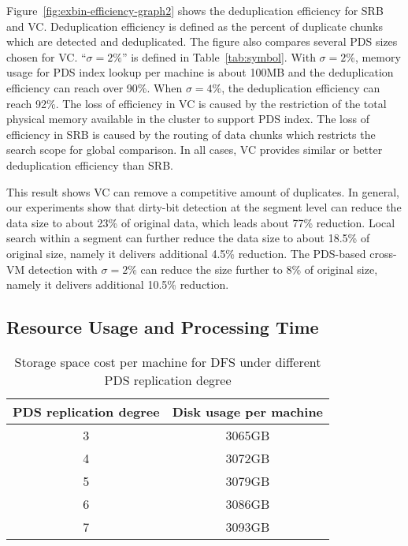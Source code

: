 Figure~\ref{fig:exbin-efficiency-graph2} shows the deduplication efficiency for SRB and VC.
Deduplication efficiency is defined as the percent of duplicate chunks
which are detected and deduplicated.
The figure also compares several PDS sizes chosen for VC. ``$\sigma=2\%$'' 
is defined in Table~\ref{tab:symbol}. 
With $\sigma=2\%$, memory usage for PDS index lookup per machine is about 100MB
and  the deduplication efficiency can reach over 90\%.
When $\sigma=4\%$, the deduplication efficiency can reach 92\%. 
The loss of efficiency in VC is caused by the restriction of the total physical memory available
in the cluster to support PDS index.  
The loss of efficiency in SRB is caused by the routing of data chunks which restricts the search scope
for global comparison.
In all cases, VC provides similar or better deduplication efficiency than SRB.

This result shows VC can remove  a competitive amount of duplicates.
In general, our experiments show that
dirty-bit detection at the segment level  can reduce the data size to about 23\% of original data, 
which leads  about 77\% reduction.
Local search within a segment can   further reduce the data size
to about 18.5\% of original size, namely it delivers additional 4.5\% reduction.
The PDS-based cross-VM detection with $\sigma=2\% $
can reduce the  size further to 8\% of original size, namely it 
delivers additional 10.5\% reduction.

\subsection{Resource Usage and Processing Time}
\begin{table}
    \begin{tabular}{|c|c|}
    \hline
    PDS replication degree & Disk usage per machine  \\ \hline
    3                      & 3065GB             \\ \hline
    4                      & 3072GB             \\ \hline
    5                      & 3079GB             \\ \hline
    6                      & 3086GB             \\ \hline
    7                      & 3093GB             \\ \hline
    \end{tabular}
\caption{Storage space cost per machine for DFS under different PDS replication degree}
\label{tab:replication_cost}
\end{table}

